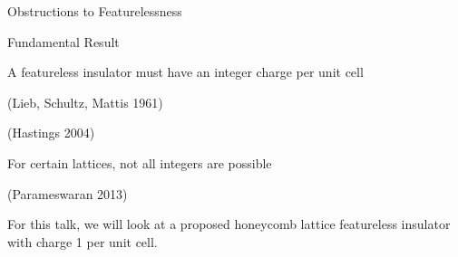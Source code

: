 \begin{frame}{Obstructions to Featurelessness}
\vskip-1cm

\begin{block}{Fundamental Result}
	\bi
		\item[] A featureless insulator must have an integer charge per unit cell
        \bi
	        \item (Lieb, Schultz, Mattis 1961)
	        \item (Hastings 2004)
        \ei
		\item[] For certain lattices, not all integers are possible
		\bi 
			\item (Parameswaran 2013)
		\ei
	\ei
   
\end{block}

For this talk, we will look at a proposed honeycomb lattice featureless insulator with charge 1 per unit cell.


\end{frame}
